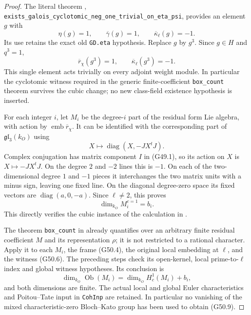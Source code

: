 \begin{proof}
The literal theorem
,
\texttt{exists\_galois\_cyclotomic\_neg\_one\_trivial\_on\_eta\_psi},
provides an element $g$ with
\[
       \eta(g)=1,\qquad \overline\gamma(g)=1,
                          \qquad\overline\kappa_\ell(g)=-1. \tag{G50.5}
\]
Its use retains the exact old \texttt{GD.eta} hypothesis.
Replace $g$ by $g^3$.  Since $g\in H$ and $q^3=1$,
\[
             \overline r_\chi(g^3)=1,
                      \qquad\overline\kappa_\ell(g^3)=-1.   \tag{G50.6}
\]
This single element acts trivially on every adjoint weight
module.  In particular the cyclotomic witness required in
the generic finite-coefficient \texttt{box\_count} theorem
survives the cubic change; no new class-field existence
hypothesis is inserted.

For each integer $i$, let $M_i$ be the degree-$i$ part of
the residual form Lie algebra, with action by
$\operatorname{emb}\overline r_\chi$.
It can be identified with the corresponding part of
$\mathfrak{gl}_3(k_O)$ using
\[
                       X\longmapsto\operatorname{diag}(X,-JX^tJ).
                                                                  \tag{G50.7}
\]
Complex conjugation has matrix component $I$ in (G49.1),
so its action on $X$ is $X\mapsto-JX^tJ$.
On the degree $2$ and $-2$ lines this is $-1$.
On each of the two-dimensional degree $1$ and $-1$ pieces
it interchanges the two matrix units with a minus sign,
leaving one fixed line.  On the diagonal degree-zero
space its fixed vectors are
$\operatorname{diag}(a,0,-a)$.
Since $\ell\ne2$, this proves
\[
                             \dim_{k_O} M_i^{c=1}=b_i.       \tag{G50.8}
\]
This directly verifies the cubic instance of the calculation
in .

The theorem \texttt{box\_count} in
 already quantifies
over an arbitrary finite residual coefficient $M$ and
its representation $\rho$; it is not restricted to a
rational character.
Apply it to each $M_i$, the frame (G50.4), the original
local embedding at $\ell$, and the witness (G50.6).
The preceding steps check its open-kernel, local
prime-to-$\ell$ index and global witness hypotheses.
Its conclusion is
\[
 \dim_{k_O}\operatorname{Ob}(M_i)
       =\dim_{k_O} H^1_c(M_i)+b_i,                          \tag{G50.9}
\]
and both dimensions are finite.  The actual local and
global Euler characteristics and Poitou--Tate input in
\texttt{CohInp} are retained.  In particular no vanishing
of the mixed characteristic-zero Bloch--Kato group has
been used to obtain (G50.9).


\end{proof}
